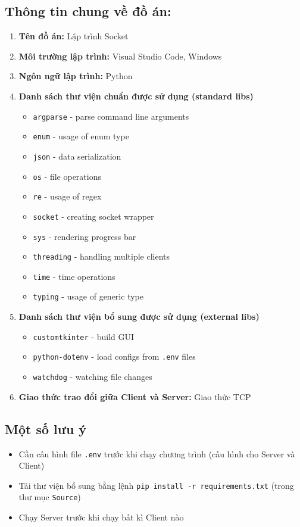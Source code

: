\documentclass[a4paper,12pt]{report}
\begin{document}
\subsection{Thông tin chung về đồ án:}
\begin{enumerate}
  \item \textbf{Tên đồ án:} Lập trình Socket
  \item \textbf{Môi trường lập trình:} Visual Studio Code, Windows
  \item \textbf{Ngôn ngữ lập trình:} Python
  \item \textbf{Danh sách thư viện chuẩn được sử dụng (standard libs)}
        \begin{itemize}
          \item \verb|argparse| - parse command line arguments
          \item \verb|enum| - usage of enum type
          \item \verb|json| - data serialization
          \item \verb|os| - file operations
          \item \verb|re| - usage of regex
          \item \verb|socket| - creating socket wrapper
          \item \verb|sys| - rendering progress bar
          \item \verb|threading| - handling multiple clients
          \item \verb|time| - time operations
          \item \verb|typing| - usage of generic type
        \end{itemize}
  \item \textbf{Danh sách thư viện bổ sung được sử dụng (external libs)}
        \begin{itemize}
          \item \verb|customtkinter| - build GUI
          \item \verb|python-dotenv| - load configs from \verb|.env| files
          \item \verb|watchdog| - watching file changes
        \end{itemize}
  \item  \textbf{Giao thức trao đổi giữa Client và Server:} Giao thức TCP
\end{enumerate}

\subsection{Một số lưu ý}
\begin{flushleft}
  \begin{itemize}
    \item Cần cấu hình file \verb|.env| trước khi chạy chương trình (cấu hình cho Server và Client)
    \item Tải thư viện bổ sung bằng lệnh \verb|pip install -r requirements.txt| (trong thư mục \verb|Source|)
    \item Chạy Server trước khi chạy bất kì Client nào
  \end{itemize}
\end{flushleft}
\end{document}
